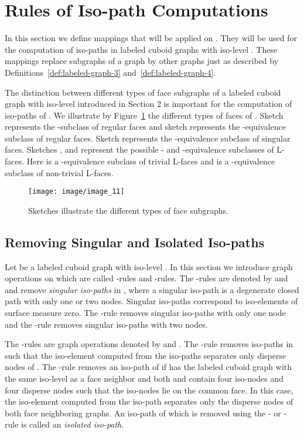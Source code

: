 \documentclass[a4paper,11pt]{article}
\begin{document}
\section{Rules of Iso-path Computations}
In this section we define mappings that will be applied on . They
will be used for the computation of iso-paths in labeled cuboid graphs with iso-level .
These mappings replace subgraphs of a graph by other graphs just as described by
Definitions~\ref{def:labeled-graph-3} and~\ref{def:labeled-graph-4}.

The distinction between different types of face subgraphs of a labeled cuboid graph 
with iso-level  introduced in Section 2 is important
for the computation of iso-paths of . We illustrate by Figure~\ref{image_11} the different types
of faces of . Sketch  represents the -subclass  of
regular faces and sketch  represents the -equivalence subclass 
of regular faces. Sketch  represents the -equivalence subclass of singular faces.
Sketches ,  and  represent the possible - and -equivalence
subclasses of L-faces. Here  is a -equivalence subclass of trivial L-faces
and  is a -equivalence subclass of non-trivial L-faces.
\begin{figure}[!ht]
\texttt{[image: image/image\_11]}
\caption{Sketches  illustrate the different types of face subgraphs.}
\label{image_11}
\end{figure}
\FloatBarrier


\subsection{Removing Singular and Isolated Iso-paths}
Let  be a labeled cuboid graph with iso-level . In this section
we introduce graph operations on  which are called -rules and -rules.
The -rules are denoted by  and  and remove {\it singular iso-paths} in , where
a singular iso-path is a degenerate closed path with only one or two nodes. Singular
iso-paths correspond to iso-elements of surface measure zero. The -rule removes singular
iso-paths with only one node and the -rule removes singular iso-paths with two nodes.

The -rules are graph operations denoted by  and . The -rule removes
iso-paths in  such that the iso-element computed from the iso-paths separates only
disperse nodes of . The -rule removes an iso-path of  if  has the
labeled cuboid graph  with the same iso-level 
as a face neighbor and both  and  contain four iso-nodes and four disperse
nodes such that the iso-nodes lie on the common face. In this case, the
iso-element computed from the iso-path separates only the disperse nodes of both
face neighboring graphs. An iso-path of  which is removed using the - or -rule is
called an {\it isolated iso-path}.\\
\end{document}
